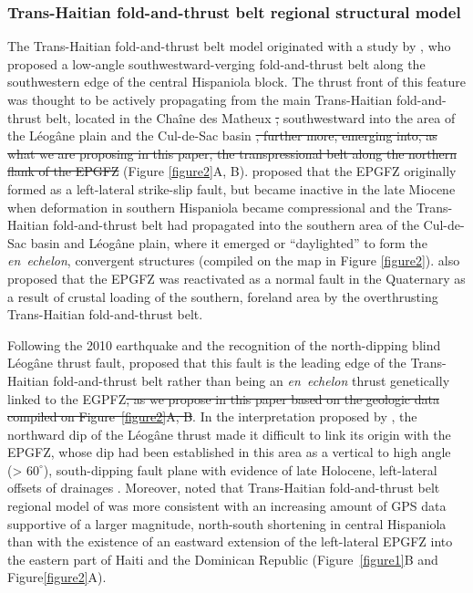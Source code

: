 \documentclass[linenumbers,draft]{agujournal}
\providecommand{\DIFadd}[1]{{\protect\color{blue}\uwave{#1}}} %
\providecommand{\DIFdel}[1]{{\protect\color{red}\sout{#1}}}                      %
\providecommand{\DIFaddbegin}{} %
\providecommand{\DIFaddend}{} %
\providecommand{\DIFdelbegin}{} %
\providecommand{\DIFdelend}{} %
\begin{document}
\subsubsection{Trans-Haitian fold-and-thrust belt regional structural model}
The Trans-Haitian fold-and-thrust belt model originated with a study by \citet{pubellier2000plate}, who proposed a low-angle southwestward-verging fold-and-thrust belt along the southwestern edge of the central Hispaniola block. The thrust front of this feature was thought to be actively propagating from the main Trans-Haitian fold-and-thrust belt, located in the Cha\^ine des Matheux \DIFdelbegin \DIFdel{, }\DIFdelend \DIFaddbegin \DIFadd{(Figure~\ref{figure1}B, Figure~\ref{figure2}A), }\DIFaddend southwestward into the area of the L\'eog\^ane plain and the Cul-de-Sac basin \DIFdelbegin \DIFdel{, further more, emerging into, as what we are proposing in this paper, the transpressional belt along the northern flank of the EPGFZ }\DIFdelend (Figure \ref{figure2}A, B). \citet{pubellier2000plate} proposed that the EPGFZ originally formed as a left-lateral strike-slip fault, but became inactive in the late Miocene when deformation in southern Hispaniola became compressional and the Trans-Haitian fold-and-thrust belt had propagated into the southern area of the Cul-de-Sac basin and L\'eog\^ane plain, where it emerged or ``daylighted'' to form the \textit{en~echelon}, convergent structures (compiled on the map in Figure \ref{figure2}). \citet{pubellier2000plate} also proposed that the EPGFZ was reactivated as a normal fault in the Quaternary as a result of crustal loading of the southern, foreland area by the overthrusting Trans-Haitian fold-and-thrust belt. 

Following the 2010 earthquake and the recognition of the north-dipping blind L\'eog\^ane thrust fault, \citet{calais2010transpressional} proposed that this fault is the leading edge of the Trans-Haitian fold-and-thrust belt rather than being an \textit{en~echelon} thrust genetically linked to the EGPFZ\DIFdelbegin \DIFdel{, as we propose in this paper based on the geologic data compiled on Figure~\ref{figure2}A, B}\DIFdelend . In the interpretation proposed by \citet{calais2010transpressional}, the northward dip of the L\'eog\^ane thrust made it difficult to link its origin with the EPGFZ, whose dip had been established in this area as a vertical to high angle (> $60^{\circ}$), south-dipping fault plane with evidence of late Holocene, left-lateral offsets of drainages \citep{prentice2010seismic}. Moreover, \citet{symithe2016present} noted that Trans-Haitian fold-and-thrust belt regional model of \citet{pubellier2000plate} was more consistent with an increasing amount of GPS data supportive of a larger magnitude, north-south shortening in central Hispaniola than with the existence of an eastward extension of the left-lateral EPGFZ into the eastern part of Haiti and the Dominican Republic (Figure~\ref{figure1}B and Figure\DIFaddbegin \DIFadd{~}\DIFaddend \ref{figure2}A).
\end{document}

